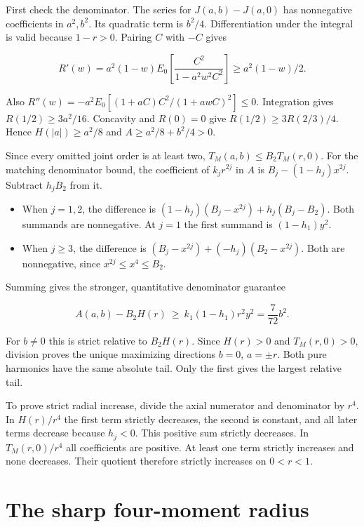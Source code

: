 First check the denominator. The series for \(J(a,b)-J(a,0)\) has nonnegative coefficients in \(a^2,b^2\). Its quadratic term is \(b^2/4\). Differentiation under the integral is valid because \(1-r>0\). Pairing \(C\) with \(-C\) gives

\[
R'(w)=a^2(1-w)E_0\!\left[\frac{C^2}{1-a^2w^2C^2}\right]\ge a^2(1-w)/2 .
\]

Also \(R''(w)=-a^2 E_0[(1+aC)C^2/(1+awC)^2]\le0\). Integration gives \(R(1/2)\ge3a^2/16\). Concavity and \(R(0)=0\) give \(R(1/2)\ge3R(2/3)/4\). Hence \(H(|a|)\ge a^2/8\) and \(A\ge a^2/8+b^2/4>0\).

Since every omitted joint order is at least two, \(T_M(a,b)\le B_2T_M(r,0)\). For the matching denominator bound, the coefficient of \(k_j r^{2j}\) in \(A\) is \(B_j-(1-h_j)x^{2j}\). Subtract \(h_jB_2\) from it.

\begin{itemize}
\tightlist
\item
  When \(j=1,2\), the difference is \((1-h_j)(B_j-x^{2j})+h_j(B_j-B_2)\). Both summands are nonnegative. At \(j=1\) the first summand is \((1-h_1)y^2\).
\item
  When \(j\ge3\), the difference is \((B_j-x^{2j})+(-h_j)(B_2-x^{2j})\). Both are nonnegative, since \(x^{2j}\le x^4\le B_2\).
\end{itemize}

Summing gives the stronger, quantitative denominator guarantee

\[
A(a,b)-B_2H(r)\ \ge\ k_1(1-h_1)r^2y^2
=\frac{7}{72} b^2 .
\]

For \(b\ne0\) this is strict relative to \(B_2H(r)\). Since \(H(r)>0\) and \(T_M(r,0)>0\), division proves the unique maximizing directions \(b=0\), \(a=\pm r\). Both pure harmonics have the same absolute tail. Only the first gives the largest relative tail.

To prove strict radial increase, divide the axial numerator and denominator by \(r^4\). In \(H(r)/r^4\) the first term strictly decreases, the second is constant, and all later terms decrease because \(h_j<0\). This positive sum strictly decreases. In \(T_M(r,0)/r^4\) all coefficients are positive. At least one term strictly increases and none decreases. Their quotient therefore strictly increases on \(0<r<1\).

\clearpage

\section{The sharp four-moment radius}\label{the-sharp-four-moment-radius}


